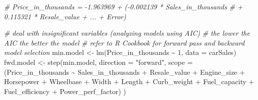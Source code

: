 \documentclass[
]{article}
\newenvironment{Shaded}{\begin{snugshade}}{\end{snugshade}}
\newcommand{\AttributeTok}[1]{\textcolor[rgb]{0.77,0.63,0.00}{#1}}
\newcommand{\CommentTok}[1]{\textcolor[rgb]{0.56,0.35,0.01}{\textit{#1}}}
\newcommand{\DecValTok}[1]{\textcolor[rgb]{0.00,0.00,0.81}{#1}}
\newcommand{\FunctionTok}[1]{\textcolor[rgb]{0.00,0.00,0.00}{#1}}
\newcommand{\NormalTok}[1]{#1}
\newcommand{\OtherTok}[1]{\textcolor[rgb]{0.56,0.35,0.01}{#1}}
\newcommand{\SpecialCharTok}[1]{\textcolor[rgb]{0.00,0.00,0.00}{#1}}
\newcommand{\StringTok}[1]{\textcolor[rgb]{0.31,0.60,0.02}{#1}}
\begin{document}
\begin{Shaded}
\begin{Highlighting}[]
\CommentTok{\#\textquotesingle{} Price\_in\_thousands =  {-}1.963969  + ({-}0.002139 * Sales\_in\_thousands}
\CommentTok{\#\textquotesingle{} + 0.115321 * Resale\_value + ... + Error)}

\CommentTok{\# deal with insignificant variables (analyzing models using AIC)}
\CommentTok{\# the lower the AIC the better the model}
\CommentTok{\# refer to R Cookbook for forward pass and backward model selection}
\NormalTok{min.model }\OtherTok{\textless{}{-}} \FunctionTok{lm}\NormalTok{(Price\_in\_thousands }\SpecialCharTok{\textasciitilde{}} \DecValTok{1}\NormalTok{, }\AttributeTok{data =}\NormalTok{ carSales)}
\NormalTok{fwd.model }\OtherTok{\textless{}{-}} \FunctionTok{step}\NormalTok{(min.model,}
                  \AttributeTok{direction =} \StringTok{"forward"}\NormalTok{,}
                  \AttributeTok{scope =}\NormalTok{ (Price\_in\_thousands }\SpecialCharTok{\textasciitilde{}}
\NormalTok{                  Sales\_in\_thousands }\SpecialCharTok{+}
\NormalTok{                  Resale\_value }\SpecialCharTok{+}
\NormalTok{                  Engine\_size }\SpecialCharTok{+}
\NormalTok{                  Horsepower }\SpecialCharTok{+}
\NormalTok{                  Wheelbase }\SpecialCharTok{+}
\NormalTok{                  Width }\SpecialCharTok{+}
\NormalTok{                  Length }\SpecialCharTok{+}
\NormalTok{                  Curb\_weight }\SpecialCharTok{+}
\NormalTok{                  Fuel\_capacity }\SpecialCharTok{+}
\NormalTok{                  Fuel\_efficiency }\SpecialCharTok{+}
\NormalTok{                  Power\_perf\_factor)}
\NormalTok{                  )}
\end{Highlighting}
\end{Shaded}
\end{document}
